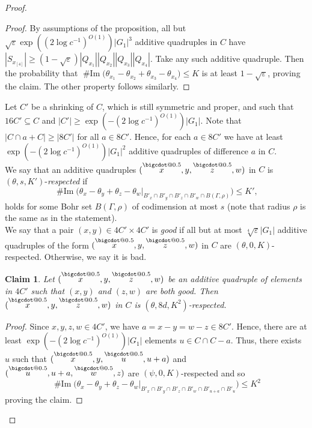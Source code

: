 \documentclass[a4paper,11pt]{article}
\makeatletter
\numberwithin{theorem}{section}
\newtheorem{claim}[theorem]{Claim}
\theoremstyle{definition}
\newcommand{\on}[1]{
	\operatorname{#1}
}
\newcommand\range{\on{\# Im}}
\newcommand*\bcdot{\mathpalette\bigcdot@{0.5}}
\newcommand*\bigcdot@[2]{\mathbin{\vcenter{\hbox{\scalebox{#2}{$\m@th#1\bullet$}}}}}
\newcommand{\upd}[1]{\overset{\bcdot}{#1}}
\makeatother
\begin{document}
\begin{proof}
\begin{proof}
        By assumptions of the proposition, all but $\sqrt{\varepsilon} \exp((2\log c^{-1})^{O(1)}) |G_1|^3$ additive quadruples in $C$ have $|S_{x_{[4]}}| \geq (1 - \sqrt{\varepsilon}) |Q_{x_1}||Q_{x_2}||Q_{x_3}||Q_{x_4}|$. Take any such additive quadruple. Then the probability that $\range\Big(\theta_{x_1} - \theta_{x_2} + \theta_{x_3} - \theta_{x_4}\Big) \leq K$ is at least $1 - \sqrt{\varepsilon}$, proving the claim. The other property follows similarly.
    \end{proof}

    Let $C'$ be a shrinking of $C$, which is still symmetric and proper, and such that $16C' \subseteq C$ and $|C'| \geq \exp(-(2\log c^{-1})^{O(1)})|G_1|$. Note that $|C \cap a+C| \geq |8C'|$ for all $a \in 8C'$. Hence, for each $a \in 8C'$ we have at least $\exp(-(2\log c^{-1})^{O(1)})|G_1|^2$ additive quadruples of difference $a$ in $C$.\\

    We say that an additive quadruples $(\upd{x}, y, \upd{z}, w)$ in $C$ is $(\theta, s, K')$-\textit{respected} if 
    \[\range\Big(\theta_{x} - \theta_{y} + \theta_z - \theta_w|_{B'_x \cap B'_{y} \cap B'_z \cap B'_w \cap B(\Gamma, \rho)}\Big) \leq K',\]
    holds for some Bohr set $B(\Gamma, \rho)$ of codimension at most $s$ (note that radius $\rho$ is the same as in the statement).\\
    \indent We say that a pair $(x,y) \in 4C' \times 4C'$ is \emph{good} if all but at most $\sqrt[4]{\varepsilon} |G_1|$ additive quadruples of the form $(\upd{x}, y, \upd{z}, w)$ in $C$ are $(\theta, 0, K)$-respected. Otherwise, we say it is bad.\\

    \begin{claim}
        Let $(\upd{x}, y, \upd{z}, w)$ be an additive quadruple of elements in $4C'$ such that $(x,y)$ and $(z,w)$ are both good. Then $(\upd{x}, y, \upd{z}, w)$ in $C$ is $(\theta, 8d, K^2)$-respected.
    \end{claim}

    \begin{proof}
        Since $x, y, z, w \in 4C'$, we have $a = x - y = w - z \in 8C'$. Hence, there are at least $\exp(-(2\log c^{-1})^{O(1)})|G_1|$ elements $u \in C \cap C - a$. Thus, there exists $u$ such that $(\upd{x}, y, \upd{u}, u+a)$ and $(\upd{u}, u+a, \upd{w}, z)$ are $(\psi, 0, K)$-respected and so 
        \[\range\Big(\theta_{x} - \theta_{y} + \theta_z - \theta_w|_{B'_x \cap B'_{y} \cap B'_z \cap B'_w \cap B'_{u + a} \cap B'_u}\Big) \leq K^2\]
        proving the claim.
    \end{proof}


\end{proof}
\end{document}
